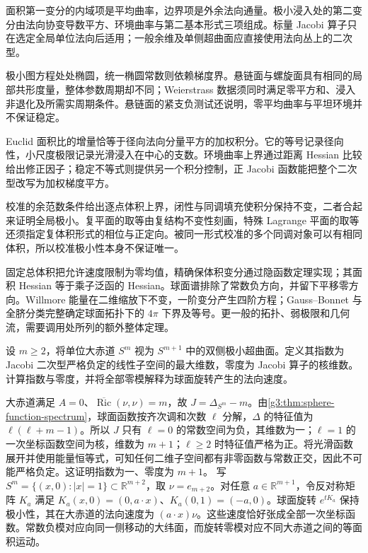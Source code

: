 \begin{chaptersummary}
	面积第一变分的内域项是平均曲率，边界项是外余法向通量。极小浸入处的第二变分由法向协变导数平方、环境曲率与第二基本形式三项组成。标量 Jacobi 算子只在选定全局单位法向后适用；一般余维及单侧超曲面应直接使用法向丛上的二次型。

	\ProseParagraphBreak

	极小图方程处处椭圆，统一椭圆常数则依赖梯度界。悬链面与螺旋面具有相同的局部共形度量，整体参数周期却不同；Weierstrass 数据须同时满足零平方和、浸入非退化及所需实周期条件。悬链面的紧支负测试还说明，零平均曲率与平坦环境并不保证稳定。

	\ProseParagraphBreak

	Euclid 面积比的增量恰等于径向法向分量平方的加权积分。它的等号记录径向性，小尺度极限记录光滑浸入在中心的支数。环境曲率上界通过距离 Hessian 比较给出修正因子；稳定不等式则提供另一个积分控制，正 Jacobi 函数能把整个二次型改写为加权梯度平方。

	\ProseParagraphBreak

	校准的余范数条件给出逐点体积上界，闭性与同调填充使积分保持不变，二者合起来证明全局极小。复平面的取等由复结构不变性刻画，特殊 Lagrange 平面的取等还须指定复体积形式的相位与正定向。被同一形式校准的多个同调对象可以有相同体积，所以校准极小性本身不保证唯一。

	\ProseParagraphBreak

	固定总体积把允许速度限制为零均值，精确保体积变分通过隐函数定理实现；其面积 Hessian 等于乘子泛函的 Hessian。球面谱排除了常数负方向，并留下平移零方向。Willmore 能量在二维缩放下不变，一阶变分产生四阶方程；Gauss--Bonnet 与全脐分类完整确定球面拓扑下的 \(4\pi\) 下界及等号。更一般的拓扑、弱极限和几何流，需要调用处所列的额外整体定理。
\end{chaptersummary}

\BookExercises

\begin{exercise}\label{g3:ex:equator-jacobi-index}
	设 \(m\ge2\)，将单位大赤道 \(S^m\) 视为 \(S^{m+1}\) 中的双侧极小超曲面。定义其指数为 Jacobi 二次型严格负定的线性子空间的最大维数，零度为 Jacobi 算子的核维数。计算指数与零度，并将全部零模解释为球面旋转产生的法向速度。
\end{exercise}
\begin{solution}
	大赤道满足 \(A=0\)、\(\overline{\operatorname{Ric}}(\nu,\nu)=m\)，故 \(J=\Delta_{S^m}-m\)。由\cref{g3:thm:sphere-function-spectrum}，球面函数按齐次调和次数 \(\ell\) 分解，\(\Delta\) 的特征值为 \(\ell(\ell+m-1)\)。所以 \(J\) 只有 \(\ell=0\) 的常数空间为负，其维数为一；\(\ell=1\) 的一次坐标函数空间为核，维数为 \(m+1\)；\(\ell\ge2\) 时特征值严格为正。将光滑函数展开并使用能量恒等式，可知任何二维子空间都有非零函数与常数正交，因此不可能严格负定。这证明指数为一、零度为 \(m+1\)。
	写 \(S^m=\{(x,0):|x|=1\}\subset\mathbb R^{m+2}\)，取 \(\nu=e_{m+2}\)。对任意 \(a\in\mathbb R^{m+1}\)，令反对称矩阵 \(K_a\) 满足 \(K_a(x,0)=(0,a\cdot x)\)、\(K_a(0,1)=(-a,0)\)。球面旋转 \(e^{tK_a}\) 保持极小性，其在大赤道的法向速度为 \((a\cdot x)\nu\)。这些速度恰好张成全部一次坐标函数。常数负模对应向同一侧移动的大纬面，而旋转零模对应不同大赤道之间的等面积运动。
\end{solution}

